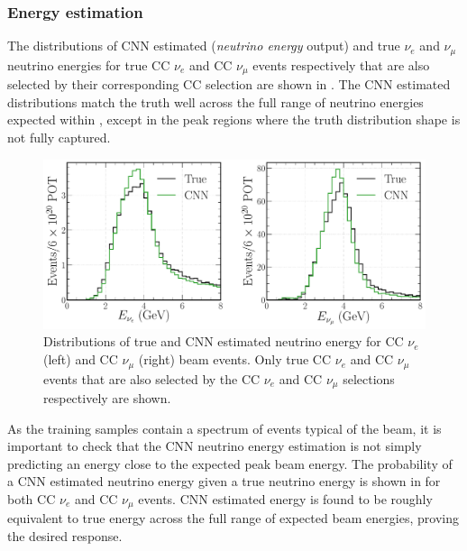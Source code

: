 \subsubsection*{Energy estimation} %

The distributions of CNN estimated (\emph{neutrino energy} output) and true $\nu_{e}$ and
$\nu_{\mu}$ neutrino energies for true CC $\nu_{e}$ and CC $\nu_{\mu}$ events respectively that
are also selected by their corresponding CC selection are shown in
. The CNN estimated distributions match the truth well across
the full range of neutrino energies expected within \chipsfive, except in the peak regions where
the truth distribution shape is not fully captured.

\begin{figure} %
    \includegraphics[width=\textwidth]{diagrams/7-results/final_energy_dists.pdf}
    \caption[Distributions of true and CNN estimated neutrino energy]
    {Distributions of true and CNN estimated neutrino energy for CC $\nu_{e}$ (left) and CC
        $\nu_{\mu}$ (right) beam events. Only true CC $\nu_{e}$ and CC $\nu_{\mu}$ events that are
        also selected by the CC $\nu_{e}$ and CC $\nu_{\mu}$ selections respectively are shown.}
    \label{fig:final_energy_dists}
\end{figure}

As the training samples contain a spectrum of events typical of the beam, it is important to check
that the CNN neutrino energy estimation is not simply predicting an energy close to the expected
peak beam energy. The probability of a CNN estimated neutrino energy given a true neutrino energy
is shown in  for both CC $\nu_{e}$ and CC $\nu_{\mu}$ events. CNN
estimated energy is found to be roughly equivalent to true energy across the full range of
expected \chipsfive beam energies, proving the desired response.

